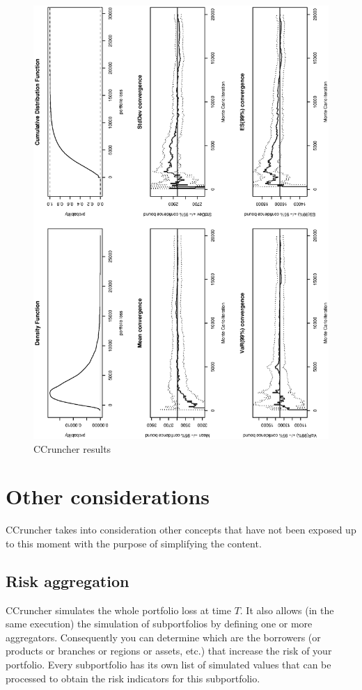 \documentclass[a4paper,12pt,final]{article}
\begin{document}
\begin{figure}[p]
\begin{center}
\includegraphics[width=12cm,angle=0]{./images/report.eps}
\caption{CCruncher results}
\label{report}
\end{center}
\end{figure}


\clearpage
\section{Other considerations}
CCruncher takes into consideration other concepts that have not been exposed 
up to this moment with the purpose of simplifying the content.

\subsection{Risk aggregation}
CCruncher simulates the whole portfolio loss at time $T$. It also allows (in 
the same execution) the simulation of subportfolios by defining one or more 
aggregators. Consequently you can determine which are the borrowers (or products 
or branches or regions or assets, etc.) that increase the risk of your portfolio. 
Every subportfolio has its own list of simulated values that can be processed to 
obtain the risk indicators for this subportfolio.
\end{document}
